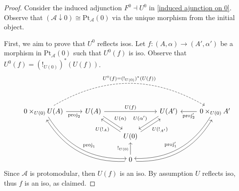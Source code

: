 \begin{subbox}{}
    \begin{proof}
        Consider the induced adjunction  $F^0 \dashv U^0$ in \eqref{induced ajunction on 0}. Observe that $(\mathcal{A} \downarrow 0) \cong \mathrm{Pt}_\mathcal{A}(0)$ via the unique morphism from the initial object.

        First, we aim to prove that $U^0$ reflects isos. Let $f:(A,\alpha)\to (A',\alpha')$ be a morphism in $\mathrm{Pt}_\mathcal{A}(0)$ such that $U^0(f)$ is iso. Observe that $U^0(f)=(!_{U(0)})^*(U(f))$. 
        \[
\begin{tikzcd}
0\times_{U(0)}U(A) \arrow[rrdd, "\mathrm{proj}_1", bend right, shift left] \arrow[r, "\mathrm{proj}_2"'] \arrow[rrrr, "U^0(f)=(!_{U(0)})^*(U(f))", dashed, bend left] & U(A) \arrow[rd, "U(\alpha)", shift left] \arrow[rr, "U(f)"] &                                                                                                   & U(A') \arrow[ld, "U(\alpha')"', shift right] & 0\times_{U(0)}A' \arrow[l, "\mathrm{proj}_2'"] \arrow[lldd, "\mathrm{proj}_1'"', bend left, shift right] \\
                                                                                                                                                                      &                                                             & U(0) \arrow[lu, "U(!_A)", shift left] \arrow[ru, "U(!_{A'})"', shift right]                       &                                              &                                                                                                          \\
                                                                                                                                                                      &                                                             & 0 \arrow[u, "!_{U(0)}"] \arrow[lluu, bend left, shift left] \arrow[rruu, bend right, shift right] &                                              &                                                                                                         
\end{tikzcd}
        \]
        Since $\mathcal{A}$ is protomodular, then $U(f)$ is an iso. By assumption $U$ reflects iso, thus $f$ is an iso, as claimed. 


\end{proof}
\end{subbox}
